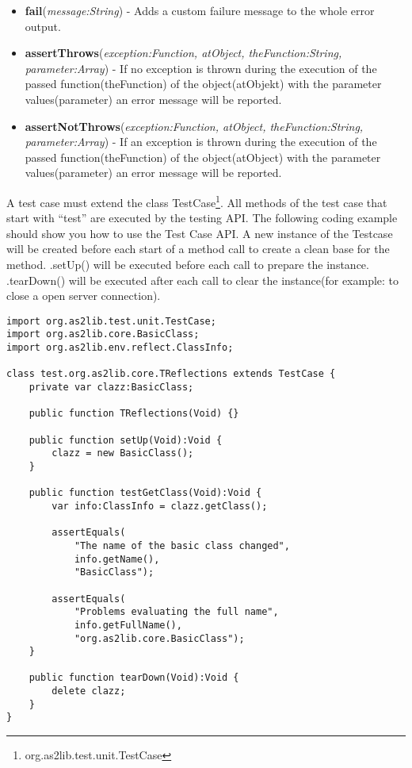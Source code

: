 \begin{itemize}
	\item \textbf{fail}(\textit{message:String}) - Adds a custom failure message to the whole error output.
	\item \textbf{assertThrows}(\textit{exception:Function, atObject, theFunction:String, parameter:Array}) - If no exception is thrown during the execution of the passed function(theFunction) of the object(atObjekt) with the parameter values(parameter) an error message will be reported.
	\item \textbf{assertNotThrows}(\textit{exception:Function, atObject, theFunction:String, parameter:Array}) - If an exception is thrown during the execution of the passed function(theFunction) of the object(atObject) with the parameter values(parameter) an error message will be reported.
\end{itemize}

A test case must extend the class TestCase\footnote{org.as2lib.test.unit.TestCase}. All methods of the test case that start with ``test'' are executed by the testing API. The following coding example should show you how to use the Test Case API.
A new instance of the Testcase will be created before each start of a method call to create a clean base for the method. .setUp() will be executed before each call to prepare the instance. .tearDown() will be executed after each call to clear the instance(for example: to close a open server connection).
\begin{lstlisting}[frame=single]
import org.as2lib.test.unit.TestCase;
import org.as2lib.core.BasicClass;
import org.as2lib.env.reflect.ClassInfo;

class test.org.as2lib.core.TReflections extends TestCase {
	private var clazz:BasicClass;
	
	public function TReflections(Void) {}
	
	public function setUp(Void):Void {
		clazz = new BasicClass();
	}
	
	public function testGetClass(Void):Void {
		var info:ClassInfo = clazz.getClass();
		
		assertEquals(
			"The name of the basic class changed",
			info.getName(),
			"BasicClass");
		
		assertEquals(
			"Problems evaluating the full name",
			info.getFullName(),
			"org.as2lib.core.BasicClass");
	}
	
	public function tearDown(Void):Void {
		delete clazz;
	}
}
\end{lstlisting}

